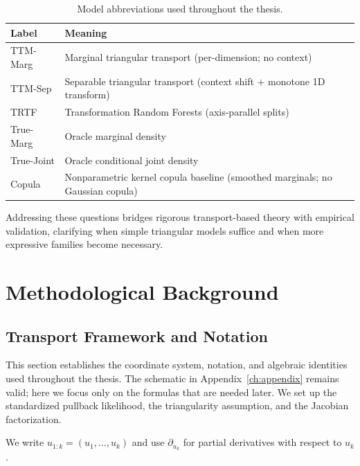 \documentclass[11pt,a4paper,twoside]{book}\usepackage[]{graphicx}\usepackage[]{xcolor}
\begin{document}
\begin{table}[t]
  \centering
  \caption{Model abbreviations used throughout the thesis.}
  \label{tab:model-abbrev}
  \begin{tabular}{ll}
    \hline
    Label & Meaning \\
    \hline
    TTM-Marg  & Marginal triangular transport (per-dimension; no context) \\
    TTM-Sep   & Separable triangular transport (context shift $+$ monotone 1D transform) \\
    TRTF      & Transformation Random Forests (axis-parallel splits) \\
    True-Marg & Oracle marginal density \\
    True-Joint& Oracle conditional joint density \\
    Copula    & Nonparametric kernel copula baseline (smoothed marginals; no Gaussian copula) \\
    \hline
  \end{tabular}
\end{table}

Addressing these questions bridges rigorous transport-based theory with empirical validation, clarifying when simple triangular models suffice and when more expressive families become necessary.






\chapter{Methodological Background}\label{ch:background}

\section{Transport Framework and Notation}\label{sec:transport-frame}

This section establishes the coordinate system, notation, and algebraic identities used throughout the thesis. The schematic in Appendix~\ref{ch:appendix} remains valid; here we focus only on the formulas that are needed later. We set up the standardized pullback likelihood, the triangularity assumption, and the Jacobian factorization.

We write $u_{1:k}=(u_1,\ldots,u_k)$ and use $\partial_{u_k}$ for partial derivatives with respect to $u_k$.
\end{document}
